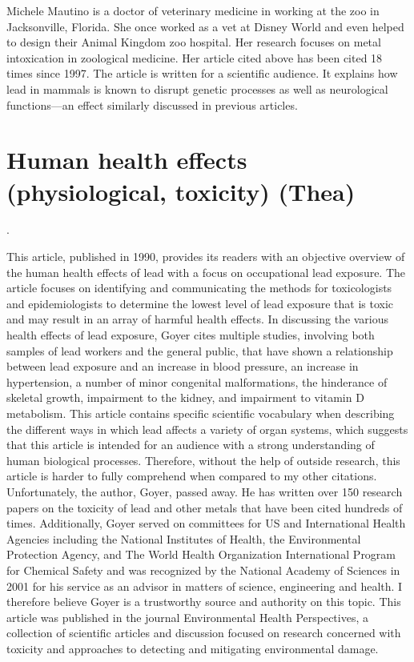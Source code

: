 \documentclass{article}
\begin{document}
Michele Mautino is a doctor of veterinary medicine in working at the zoo in Jacksonville, Florida. She once worked as a vet at Disney World and even helped to design their Animal Kingdom zoo hospital. Her research focuses on metal intoxication in zoological medicine. Her article cited above has been cited 18 times since 1997. The article is written for a scientific audience. It explains how lead in mammals is known to disrupt genetic processes as well as neurological functions—an effect similarly discussed in previous articles.

\section{Human health effects (physiological, toxicity) (Thea)}
\bigskip

. 
\bigskip

This article, published in 1990, provides its readers with an objective overview of the human health effects of lead with a focus on occupational lead exposure. The article focuses on identifying and communicating the methods for toxicologists and epidemiologists to determine the lowest level of lead exposure that is toxic and may result in an array of harmful health effects. In discussing the various health effects of lead exposure, Goyer cites multiple studies, involving both samples of lead workers and the general public, that have shown a relationship between lead exposure and an increase in blood pressure, an increase in hypertension, a number of minor congenital malformations, the hinderance of skeletal growth, impairment to the kidney, and impairment to vitamin D metabolism. This article contains specific scientific vocabulary when describing the different ways in which lead affects a variety of organ systems, which suggests that this article is intended for an audience with a strong understanding of human biological processes. Therefore, without the help of outside research, this article is harder to fully comprehend when compared to my other citations. Unfortunately, the author, Goyer, passed away. He has written over 150 research papers on the toxicity of lead and other metals that have been cited hundreds of times. Additionally, Goyer served on committees for US and International Health Agencies including the National Institutes of Health, the Environmental Protection Agency, and The World Health Organization International Program for Chemical Safety and was recognized by the National Academy of Sciences in 2001 for his service as an advisor in matters of science, engineering and health. I therefore believe Goyer is a trustworthy source and authority on this topic. This article was published in the journal Environmental Health Perspectives, a collection of scientific articles and discussion focused on research concerned with toxicity and approaches to detecting and mitigating environmental damage. 
\bigskip
\end{document}
